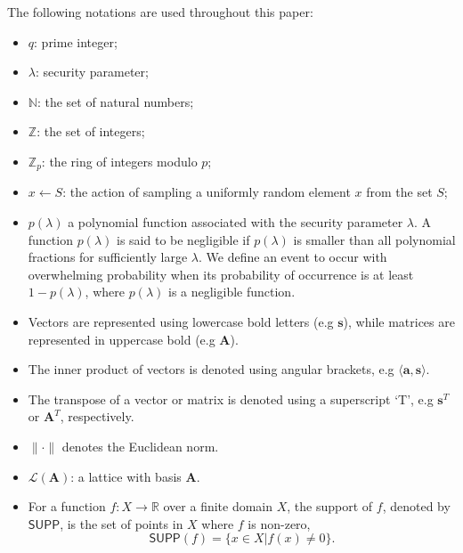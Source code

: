 The following notations are used throughout this paper:
\begin{itemize}
    \item $q$: prime integer;
    \item $\lambda$: security parameter;
    \item $\mathbb{N}$: the set of natural numbers;
    \item $\mathbb{Z}$: the set of integers;
    \item $\mathbb{Z}_p$: the ring of integers modulo $p$;
    \item $x\gets S$: the action of sampling a uniformly random element $x$ from the set $S$;
    \item $p(\lambda)$ a polynomial function associated with the security parameter $\lambda$. A function $p(\lambda)$ is said to be negligible if $p(\lambda)$ is smaller than all polynomial fractions for sufficiently large $\lambda$. We define an event to occur with overwhelming probability when its probability of occurrence is at least $1-p(\lambda)$, where $p(\lambda)$ is a negligible function. 
    \item Vectors are represented using lowercase bold letters (e.g $\mathbf{s}$), while matrices are represented in uppercase bold (e.g $\mathbf{A}$).
    \item The inner product of vectors is denoted using angular brackets, e.g $\langle\mathbf{a},\mathbf{s}\rangle$.
    \item The transpose of a vector or matrix is denoted using a superscript `T', e.g $\mathbf{s}^T$ or $\mathbf{A}^T$, respectively.
    \item $\|\cdot\|$ denotes the Euclidean norm.
    \item $\mathcal{L}(\mathbf{A})$: a lattice with basis $\mathbf{A}$.
    \item For a function $f:X\to \mathbb{R}$ over a finite domain $X$, the support of $f$, denoted by $\mathsf{SUPP}$, is the set of points in $X$ where $f$ is non-zero,
    $$\mathsf{SUPP}(f)=\{x\in X|f(x)\neq 0\}.$$
\end{itemize}
